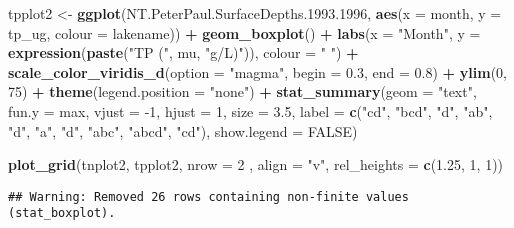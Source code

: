 \documentclass[]{article}
\newenvironment{Shaded}{\begin{snugshade}}{\end{snugshade}}
\newcommand{\DataTypeTok}[1]{\textcolor[rgb]{0.13,0.29,0.53}{#1}}
\newcommand{\DecValTok}[1]{\textcolor[rgb]{0.00,0.00,0.81}{#1}}
\newcommand{\FloatTok}[1]{\textcolor[rgb]{0.00,0.00,0.81}{#1}}
\newcommand{\KeywordTok}[1]{\textcolor[rgb]{0.13,0.29,0.53}{\textbf{#1}}}
\newcommand{\NormalTok}[1]{#1}
\newcommand{\OperatorTok}[1]{\textcolor[rgb]{0.81,0.36,0.00}{\textbf{#1}}}
\newcommand{\OtherTok}[1]{\textcolor[rgb]{0.56,0.35,0.01}{#1}}
\newcommand{\StringTok}[1]{\textcolor[rgb]{0.31,0.60,0.02}{#1}}
\begin{document}
\begin{Shaded}
\begin{Highlighting}[]
\NormalTok{tpplot2 <-}\StringTok{ }\KeywordTok{ggplot}\NormalTok{(NT.PeterPaul.SurfaceDepths.}\FloatTok{1993.1996}\NormalTok{,  }\KeywordTok{aes}\NormalTok{(}\DataTypeTok{x =}\NormalTok{ month, }\DataTypeTok{y =}\NormalTok{ tp_ug, }\DataTypeTok{colour =}\NormalTok{ lakename)) }\OperatorTok{+}
\StringTok{  }\KeywordTok{geom_boxplot}\NormalTok{() }\OperatorTok{+}
\StringTok{  }\KeywordTok{labs}\NormalTok{(}\DataTypeTok{x =} \StringTok{"Month"}\NormalTok{, }\DataTypeTok{y =} \KeywordTok{expression}\NormalTok{(}\KeywordTok{paste}\NormalTok{(}\StringTok{"TP ("}\NormalTok{, mu, }\StringTok{"g/L)"}\NormalTok{)), }\DataTypeTok{colour =} \StringTok{" "}\NormalTok{) }\OperatorTok{+}\StringTok{ }
\StringTok{  }\KeywordTok{scale_color_viridis_d}\NormalTok{(}\DataTypeTok{option =} \StringTok{"magma"}\NormalTok{, }\DataTypeTok{begin =} \FloatTok{0.3}\NormalTok{, }\DataTypeTok{end =} \FloatTok{0.8}\NormalTok{) }\OperatorTok{+}
\StringTok{  }\KeywordTok{ylim}\NormalTok{(}\DecValTok{0}\NormalTok{, }\DecValTok{75}\NormalTok{) }\OperatorTok{+}
\StringTok{  }\KeywordTok{theme}\NormalTok{(}\DataTypeTok{legend.position =} \StringTok{"none"}\NormalTok{) }\OperatorTok{+}\StringTok{ }
\StringTok{  }\KeywordTok{stat_summary}\NormalTok{(}\DataTypeTok{geom =} \StringTok{"text"}\NormalTok{, }\DataTypeTok{fun.y =}\NormalTok{ max, }\DataTypeTok{vjust =} \DecValTok{-1}\NormalTok{, }\DataTypeTok{hjust =} \DecValTok{1}\NormalTok{, }\DataTypeTok{size =} \FloatTok{3.5}\NormalTok{,}
               \DataTypeTok{label =} \KeywordTok{c}\NormalTok{(}\StringTok{"cd"}\NormalTok{, }\StringTok{"bcd"}\NormalTok{, }\StringTok{"d"}\NormalTok{, }\StringTok{"ab"}\NormalTok{, }\StringTok{"d"}\NormalTok{, }\StringTok{"a"}\NormalTok{, }\StringTok{"d"}\NormalTok{, }\StringTok{"abc"}\NormalTok{, }\StringTok{"abcd"}\NormalTok{, }\StringTok{"cd"}\NormalTok{), }\DataTypeTok{show.legend =} \OtherTok{FALSE}\NormalTok{)}

\KeywordTok{plot_grid}\NormalTok{(tnplot2, tpplot2,  }\DataTypeTok{nrow =} \DecValTok{2}\NormalTok{ , }\DataTypeTok{align =} \StringTok{"v"}\NormalTok{, }\DataTypeTok{rel_heights =} \KeywordTok{c}\NormalTok{(}\FloatTok{1.25}\NormalTok{, }\DecValTok{1}\NormalTok{, }\DecValTok{1}\NormalTok{))}
\end{Highlighting}
\end{Shaded}

\begin{verbatim}
## Warning: Removed 26 rows containing non-finite values (stat_boxplot).
\end{verbatim}
\end{document}
